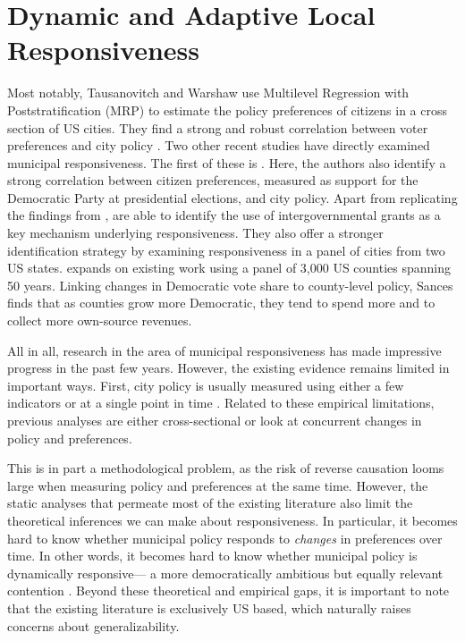 \documentclass[a4paper,12pt]{article}
\begin{document}
\section*{Dynamic and Adaptive Local Responsiveness}
 Most notably, Tausanovitch and Warshaw use Multilevel Regression with Poststratification (MRP) to estimate the policy preferences of citizens in a cross section of US cities. They find a strong and robust correlation between voter preferences and city policy \citep[for earlier efforts, see ][]{hajnal2010or,palus2010responsiveness}. Two other recent studies have directly examined municipal responsiveness. The first of these is \cite{einstein2016pushing}. Here, the authors also identify a strong correlation between citizen preferences, measured as support for the Democratic Party at presidential elections,  and city policy. Apart from replicating the findings from \citeauthor{tausanovitch2014representation}, \citeauthor{einstein2016pushing} are able to identify the use of intergovernmental grants as a key mechanism underlying responsiveness. They also offer a stronger identification strategy by examining responsiveness in a panel of cities from two US states.  \citet{sances2017voters} expands on existing work using a panel of 3,000 US counties spanning 50 years. Linking changes in Democratic vote share to county-level policy, Sances finds that as counties grow more Democratic, they tend to spend more and to collect more own-source revenues.

All in all, research in the area of municipal responsiveness has made impressive progress in the past few years. However, the existing evidence remains limited in important ways. First, city policy is usually measured using either a few indicators \citep{sances2017voters,einstein2016pushing} or at a single point in time \citep{tausanovitch2014representation}. Related to these empirical limitations, previous analyses are either cross-sectional or look at concurrent changes in policy and preferences. 



This is in part a methodological problem, as the risk of reverse causation looms large when measuring policy and preferences at the same time. However, the static analyses that permeate most of the existing literature also limit the theoretical inferences we can make about responsiveness. In particular, it becomes hard to know whether municipal policy responds to \textit{changes} in preferences over time. In other words, it becomes hard to know whether municipal policy is dynamically responsive--- a more democratically ambitious but equally relevant contention \citep[cf.][]{stimson1995dynamic}. Beyond these theoretical and empirical gaps, it is important to note that the existing literature is exclusively US based, which naturally raises concerns about generalizability.
\end{document}
